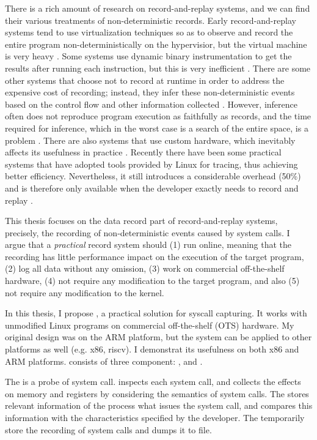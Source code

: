 There is a rich amount of research on record-and-replay systems, and we can find
their various treatments of non-deterministic records. Early record-and-replay
systems tend to use virtualization techniques so as to observe and record the
entire program non-deterministically on the hypervisior, but the virtual machine
is very heavy \cite{dunlap_revirt_2003, dunlap_smp-revirt_2008}. Some systems
use dynamic binary instrumentation to get the results after running each
instruction, but this is very inefficient \cite{bhansali_framework_2006}. There
are some other systems that choose not to record at runtime in order to address
the expensive cost of recording; instead, they infer these non-deterministic
events based on the control flow and other information collected
\cite{altekar_odr_2009,cui_rept_2018}. However, inference often does not
reproduce program execution as faithfully as records, and the time required for
inference, which in the worst case is a search of the entire space, is a problem
\cite{replay_survey}. There are also systems that use custom hardware, which
inevitably affects its usefulness in practice \cite{montesinos_capo_2009}.
Recently there have been some practical systems that have adopted tools provided
by Linux for tracing, thus achieving better efficiency. Nevertheless, it still
introduces a considerable overhead (50\%) and is therefore only available
when the developer exactly needs to record and replay \cite{203227}.

This thesis focuses on the data record part of record-and-replay systems, precisely, the recording of non-deterministic events caused by system calls. I argue that a \textit{practical} record system should  (1) run online, meaning that the recording has little performance impact on the execution of the target program, (2) log all data without any omission, (3) work on commercial off-the-shelf hardware, (4) not require any modification to the target program, and also (5) not require any modification to the kernel.

In this thesis, I propose \TheName, a practical solution for syscall capturing. 
It works with unmodified Linux programs on commercial off-the-shelf (OTS) hardware. My original design was on the ARM platform, but the system can be applied to other platforms as well (e.g. x86, riscv). I demonstrat its usefulness on both x86 and ARM platforms. \TheName consists of three component: \CoreHook, \Filter and \RecordBuffer.

The \CoreHook is a probe of system call. \CoreHook inspects each system call,   and collects the effects on memory and registers by considering the semantics of system calls. The \Filter stores relevant information of the process what issues the system call, and compares this information with the characteristics specified by the developer. The \RecordBuffer temporarily store the recording of system calls and dumps it to file.

